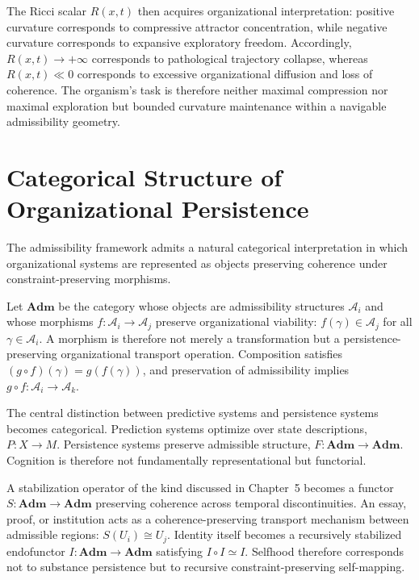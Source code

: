 \documentclass[12pt,a4paper]{report}
\theoremstyle{flyxion}
\begin{document}
The Ricci scalar $R(x,t)$ then acquires organizational interpretation: positive curvature corresponds to compressive attractor concentration, while negative curvature corresponds to expansive exploratory freedom. Accordingly, $R(x,t) \rightarrow +\infty$ corresponds to pathological trajectory collapse, whereas $R(x,t) \ll 0$ corresponds to excessive organizational diffusion and loss of coherence. The organism's task is therefore neither maximal compression nor maximal exploration but bounded curvature maintenance within a navigable admissibility geometry.


\chapter{Categorical Structure of Organizational Persistence}

The admissibility framework admits a natural categorical interpretation in which organizational systems are represented as objects preserving coherence under constraint-preserving morphisms.

Let $\mathbf{Adm}$ be the category whose objects are admissibility structures $\mathcal{A}_i$ and whose morphisms $f : \mathcal{A}_i \rightarrow \mathcal{A}_j$ preserve organizational viability: $f(\gamma) \in \mathcal{A}_j$ for all $\gamma \in \mathcal{A}_i$. A morphism is therefore not merely a transformation but a persistence-preserving organizational transport operation. Composition satisfies $(g \circ f)(\gamma) = g(f(\gamma))$, and preservation of admissibility implies $g \circ f : \mathcal{A}_i \rightarrow \mathcal{A}_k$.

The central distinction between predictive systems and persistence systems becomes categorical. Prediction systems optimize over state descriptions, $P : X \rightarrow M$. Persistence systems preserve admissible structure, $F : \mathbf{Adm} \rightarrow \mathbf{Adm}$. Cognition is therefore not fundamentally representational but functorial.

A stabilization operator of the kind discussed in Chapter~5 becomes a functor $S : \mathbf{Adm} \rightarrow \mathbf{Adm}$ preserving coherence across temporal discontinuities. An essay, proof, or institution acts as a coherence-preserving transport mechanism between admissible regions: $S(U_i) \cong U_j$. Identity itself becomes a recursively stabilized endofunctor $I : \mathbf{Adm} \rightarrow \mathbf{Adm}$ satisfying $I \circ I \simeq I$. Selfhood therefore corresponds not to substance persistence but to recursive constraint-preserving self-mapping.
\end{document}
